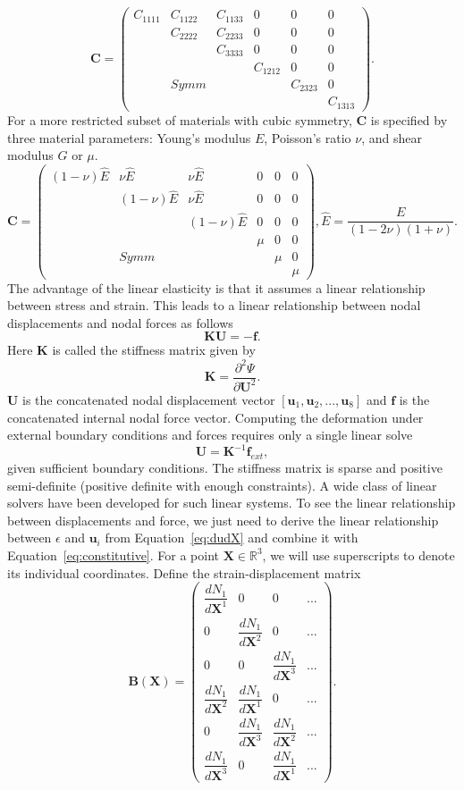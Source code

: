 \[
\mathbf{C}=
\begin{pmatrix}
C_{1111} & C_{1122} & C_{1133} & 0 & 0 & 0 \\
 & C_{2222} & C_{2233} & 0 & 0 & 0 \\
& & C_{3333} & 0 & 0 & 0 \\
& & & C_{1212} & 0 & 0 \\
 & Symm &  & & C_{2323} & 0 \\
 & & & & & C_{1313}
\end{pmatrix}.
\]
For a more restricted subset of materials with cubic symmetry, 
$\mathbf{C}$ is specified by three material parameters: Young's modulus $E$,
Poisson's ratio $\nu$, and shear modulus $G$ or $\mu$.
\[\mathbf{C}=
\begin{pmatrix}
(1-\nu)\hat{E} & \nu\hat{E} & \nu\hat{E} & 0 & 0 & 0 \\
&(1-\nu)\hat{E} & \nu\hat{E} & 0 & 0 & 0 \\
& &(1-\nu)\hat{E} & 0 & 0 & 0 \\
& & & \mu & 0 & 0 \\
& Symm &  & & \mu & 0 \\
& & & & & \mu
\end{pmatrix},\hat{E} = \frac{E}{(1-2\nu)(1+\nu)}.
\]
The advantage of the linear elasticity is that it assumes a linear relationship between stress and strain. This leads to a linear relationship between nodal displacements and nodal forces
as follows
\[
\mathbf{K}\mathbf{U}=-\mathbf{f}.
\]
Here $\mathbf{K}$ is called the stiffness matrix given by
\[
\mathbf{K}=\frac{\partial^2 \Psi}{\partial\mathbf{U}^2}.
\]
$\mathbf{U}$ is the concatenated nodal displacement vector
$[\mathbf{u}_1,\mathbf{u}_2,...,\mathbf{u}_8]$ and $\mathbf{f}$ is the concatenated internal nodal force vector.
Computing the deformation under external boundary conditions and forces requires only a single linear solve
\[
\mathbf{U}=\mathbf{K}^{-1}\mathbf{f}_{ext},
\]
given sufficient boundary conditions.
The stiffness matrix is sparse and positive semi-definite (positive definite with enough constraints).
A wide class of linear solvers have been developed for such linear systems.
To see the linear relationship between displacements and force,
we just need to derive the linear relationship between $\epsilon$ and $\mathbf{u}_i$
from Equation~\ref{eq:dudX} and combine it with Equation~\ref{eq:constitutive}.
For a point $\mathbf{X}\in\mathbb{R}^3$, we will use superscripts to denote its individual coordinates.
Define the strain-displacement matrix
\[
\mathbf{B}(\mathbf{X})=
\begin{pmatrix}
\dfrac{dN_1}{d\mathbf{X}^1} & 0 & 0 & ... \\
0 & \dfrac{dN_1}{d\mathbf{X}^2} & 0 & ... \\
0 & 0 & \dfrac{dN_1}{d\mathbf{X}^3} & ... \\
\dfrac{dN_1}{d\mathbf{X}^2} & \dfrac{dN_1}{d\mathbf{X}^1} & 0 & ... \\
0 & \dfrac{dN_1}{d\mathbf{X}^3} & \dfrac{dN_1}{d\mathbf{X}^2} & ... \\
\dfrac{dN_1}{d\mathbf{X}^3} & 0 & \dfrac{dN_1}{d\mathbf{X}^1} & ...
\end{pmatrix}.
\]
